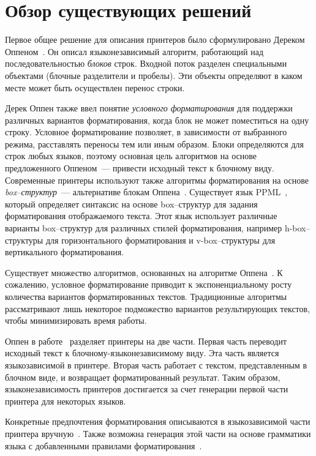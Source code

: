\section{Обзор существующих решений}
Первое общее решение для описания принтеров было сформулировано Дереком Оппеном~\cite{oppen}. Он описал языконезависимый алгоритм, работающий над последовательностью \textit{блоков} строк. Входной поток разделен специальными объектами (блочные разделители и пробелы). Эти объекты определяют в каком месте может быть осуществлен перенос строки.

Дерек Оппен также ввел понятие \textit{условного форматирования} для поддержки различных вариантов форматирования, когда блок не может поместиться на одну строку. Условное форматирование позволяет, в зависимости от выбранного режима, расставлять переносы тем или иным образом. Блоки определяются для строк любых языков, поэтому основная цель алгоритмов на основе предложенного Оппеном~--- привести исходный текст к блочному виду. Современные принтеры используют также алгоритмы форматирования на основе \textit{box--структур}~--- альтернативе блокам Оппена~\cite{oppenlike:mikelsons, box:knuth}. Существует язык PPML~\cite{oppenlike:morcos}, который определяет синтаксис на основе box--структур для задания форматирования отображаемого текста. Этот язык использует различные варианты box--структур для различных стилей форматирования, например h-box--структуры для горизонтального форматирования и v-box--структуры для вертикального форматирования.

Существует множество алгоритмов, основанных на алгоритме Оппена~\cite{oppenlike:rose, oppenlike:mikelsons, oppenlike:rubin, oppenlike:morcos, oppenlike:brand, oppenfunc:swierstra, oppenfunc:hughes, oppenfunc:wadler}. К сожалению, условное форматирование приводит к экспоненциальному росту количества вариантов форматированных текстов. Традиционные алгоритмы рассматривают лишь некоторое подможество вариантов результирующих текстов, чтобы минимизировать время работы. 

Оппен в работе~\cite{oppen} разделяет принтеры на две части. Первая часть переводит исходный текст к блочному-языконезависимому виду. Эта часть является языкозависимой в принтере. Вторая часть работает с текстом, представленным в блочном виде, и возвращает форматированный результат. Таким образом, языконезависимость принтеров достигается за счет генерации первой части принтера для некоторых языков.

Конкретные предпочтения форматирования описываются в языкозависимой части принтера вручную~\cite{jokinen, oppenlike:morcos}. Также возможна генерация этой части на основе грамматики языка с добавленными правилами форматирования~\cite{boulton, oppenlike:rose, oppenlike:rubin}.

